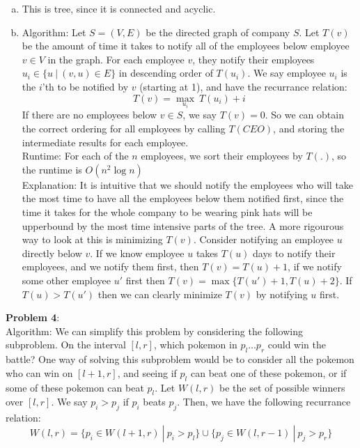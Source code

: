 \documentclass{article}
\begin{document}
\begin{enumerate}[a)]
    \item This is tree, since it is connected and acyclic.
    \item Algorithm: Let $S = (V, E)$ be the directed graph of company $S$. Let $T(v)$ be the amount of time it takes to notify all of the employees below employee $v \in V$ in the graph. For each employee $v$, they notify their employees $u_i \in \{u\ |\ (v, u) \in E\}$ in descending order of $T(u_i)$. We say employee $u_i$ is the $i$'th to be notified by $v$ (starting at 1), and have the recurrance relation:
    \begin{equation*}
        T(v) = \max_{u_i}\ T(u_i) + i
    \end{equation*}
    If there are no employees below $v \in S$, we say $T(v) = 0$. So we can obtain the correct ordering for all employees by calling $T(CEO)$, and storing the intermediate results for each employee. \\[0.5ex]
    Runtime: For each of the $n$ employees, we sort their employees by $T(.)$, so the runtime is $O(n^2 \log n)$\\[0.5ex]
    Explanation: It is intuitive that we should notify the employees who will take the most time to have all the employees below them notified first, since the time it takes for the whole company to be wearing pink hats will be upperbound by the most time intensive parts of the tree. A more rigourous way to look at this is minimizing $T(v)$. Consider notifying an employee $u$ directly below $v$. If we know employee $u$ takes $T(u)$ days to notify their employees, and we notify them first, then $T(v) = T(u) + 1$, if we notify some other employee $u'$ first then $T(v) = \max\{T(u') + 1, T(u) + 2\}$. If $T(u) > T(u')$ then we can clearly minimize $T(v)$ by notifying $u$ first.
\end{enumerate}
\textbf{Problem 4}: \\[1.0ex]
Algorithm: We can simplify this problem by considering the following subproblem. On the interval $[l, r]$, which pokemon in $p_l \dots p_r$ could win the battle? One way of solving this subproblem would be to consider all the pokemon who can win on $[l + 1, r]$, and seeing if $p_l$ can beat one of these pokemon, or if some of these pokemon can beat $p_l$. Let $W(l, r)$ be the set of possible winners over $[l, r]$. We say $p_i > p_j$ if $p_i$ beats $p_j$. Then, we have the following recurrance relation: 
\begin{equation*}
    W(l, r) = \{p_i \in W(l + 1, r)\ |\ p_i > p_l\} \cup \{p_j \in W(l, r - 1)\ |\ p_j > p_r\}
\end{equation*}
\end{document}

